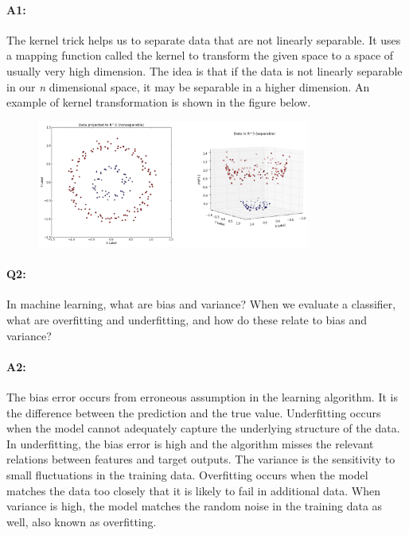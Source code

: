 \paragraph{A1:} The kernel trick helps us to separate data that are not linearly separable. It uses a mapping function called the kernel to transform the given space to a space of usually very high dimension. The idea is that if the data is not linearly separable in our \emph{n} dimensional space, it may be separable in a higher dimension. An example of kernel transformation is shown in the figure below.
\begin{figure}[H]
	\centering
	\includegraphics[width=0.8\textwidth]{kernel_trick.png}
	\label{fig:kernel}
\end{figure}




\pagebreak
\paragraph{Q2:} In machine learning, what are bias and variance? When we evaluate a classifier, what are overfitting and underfitting, and how do these relate to bias and variance?

\paragraph{A2:} The bias error occurs from erroneous assumption in the learning algorithm. It is the difference between the prediction and the true value. Underfitting occurs when the model cannot adequately capture the underlying structure of the data. In underfitting, the bias error is high and the algorithm misses the relevant relations between features and target outputs. The variance is the sensitivity to small fluctuations in the training data. Overfitting occurs when the model matches the data too closely that it is likely to fail in additional data. When variance is high, the model matches the random noise in the training data as well, also known as overfitting. 



